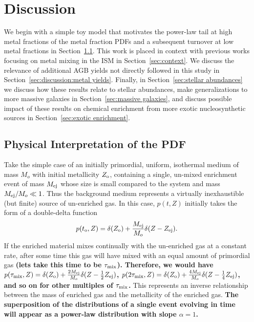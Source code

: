 \documentclass[twocolumn]{aastex61}
\begin{document}
\section{Discussion}
\label{sec:discussion}
We begin with a simple toy model that motivates the power-law tail at high metal fractions of the metal fraction PDFs and a subsequent turnover at low metal fractions in Section~\ref{sec:interpretation}. This work is placed in context with previous works focusing on metal mixing in the ISM in Section~\ref{sec:context}. We discuss the relevance of additional AGB yields not directly followed in this study in Section~\ref{sec:discussion:metal yields}. Finally, in Section~\ref{sec:stellar abundances} we discuss how these results relate to stellar abundances, make generalizations to more massive galaxies in Section~\ref{sec:massive galaxies}, and discuss possible impact of these results on chemical enrichment from more exotic nucleosynthetic sources in Section~\ref{sec:exotic enrichment}.

\subsection{Physical Interpretation of the PDF}
\label{sec:interpretation}
Take the simple case of an initially primordial, uniform, isothermal medium of mass $M_o$ with initial metallicity $Z_{\rm o}$, containing a single, un-mixed enrichment event of mass $M_{\rm ej}$ whose size is small compared to the system and mass $M_{\rm ej} / M_o \ll 1$. Thus the background medium represents a virtually inexhaustible (but finite) source of un-enriched gas. In this case, $p(t,Z)$ initially takes the form of a double-delta function
\begin{equation}
p(t_{\rm o},Z) = \delta(Z_{\rm o}) + \frac{M_{\rm ej}}{M_o}\delta(Z - Z_{\rm ej}).
\end{equation}
If the enriched material mixes continually with the un-enriched gas at a constant rate, after some time this gas will have mixed with an equal amount of primordial gas \textbf{(lets take this time to be $\tau_{\rm mix}$). Therefore, we would have $p(\tau_{\rm mix},Z) = \delta(Z_{\rm o}) + \frac{2M_{\rm ej}}{M_o} \delta(Z - \frac{1}{2}Z_{\rm ej})$, $p(2\tau_{\rm mix},Z) = \delta(Z_{\rm o}) + \frac{4M_{\rm ej}}{M_o} \delta(Z - \frac{1}{4}Z_{\rm ej})$, and so on for other multiples of $\tau_{\rm mix}$.} This represents an inverse relationship between the mass of enriched gas and the metallicity of the enriched gas. \textbf{The superposition of the distributions of a single event evolving in time will appear as a power-law distribution with slope $\alpha = 1$.}
\end{document}
